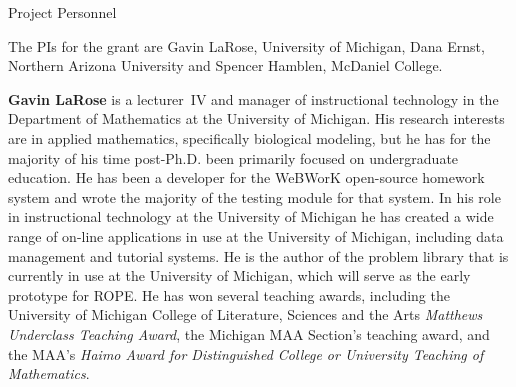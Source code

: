 \documentclass[11pt]{article}
\begin{document}
\begin{section}{Project Personnel}

The PIs for 
the grant are Gavin LaRose, University of Michigan, Dana
Ernst, Northern Arizona University and Spencer Hamblen, McDaniel College.

\textbf{Gavin LaRose} is a lecturer~IV and manager of instructional
technology in the Department of Mathematics at the University of Michigan.
His research interests are in applied mathematics, specifically biological
modeling, but he has for the majority of his time post-Ph.D. been
primarily focused on undergraduate education.  He has been a developer for
the WeBWorK open-source homework system and wrote the majority of the
testing module for that system.  In his role in instructional technology
at the University of Michigan he has created a wide range of on-line
applications in use at the University of Michigan, including data
management and tutorial systems.  He is the author of the problem library
that is currently in use at the University of Michigan, which will serve
as the early prototype for ROPE.  He has won several teaching awards,
including the University of Michigan College of Literature, Sciences
and the Arts \emph{Matthews Underclass Teaching Award}, the Michigan
MAA Section's teaching award, and the MAA's \emph{Haimo Award for
Distinguished College or University Teaching of Mathematics}.



\end{section}
\end{document}
